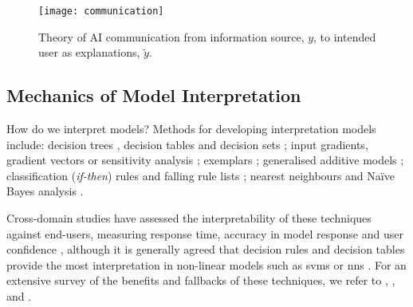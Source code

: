 \begin{figure}[t!]
  \centering
  \texttt{[image: communication]}
  \caption[Theory of AI communication]{Theory of AI communication from information source, $y$, to intended user as explanations, $\tilde{y}$.}
  \label{fig:background:probabilistic-stochastic:theory-of-ai-communication}
\end{figure}

\subsection{Mechanics of Model Interpretation}
\label{ssec:background:probabilistic-stochastic:mechanics}

How do we interpret models? Methods for developing interpretation models include: decision trees \citep{Breiman:1984tu,Hastie:2001wp,Craven:1995wg,Quinlan:1993vi,Rokach:2008wc}, decision tables \citep{Lima:2009tm,Baesens:2003we} and decision sets \citep{Lakkaraju:2016ka,Narayanan:2018ud}; input gradients, gradient vectors or sensitivity analysis \citep{Selvaraju:2017bk,Ribeiro:2016gg,Lei:2016wi,Ross:2017vn,Baehrens:2010tj}; exemplars \citep{Kim:2014ui,Frey:2007hs}; generalised additive models \citep{Caruana:2015jk}; classification (\textit{if-then}) rules \citep{Thrun:1996wh,Bramer:2007vg,Clark:1991vi,Otero:2013ul,Witten:2016ut} and falling rule lists \citep{Singh:2016wu}; nearest neighbours \citep{Martens:2011uh,Sen:1995uk,Suri:2007wl,Wettschereck:1997vw,Zhang:2008vfa} and Na\"{i}ve Bayes analysis \citep{Bellazzi:2008tv,Lavrac:1999tf,Kononenko:1993td,Zupan:2000tp,Michie:1994wi,Friedman:1997vs,Cheng:2001vw,Heckerman:2000uw}. 

Cross-domain studies have assessed the interpretability of these techniques against end-users, measuring response time, accuracy in model response and user confidence \citep{Huysmans:2011gq,Hayete:2005tn,Allahyari:2011ud,Subramanian:1992ue,Schwabacher:2001wc,Freitas:2010vk,Martens:2011uh,Verbeke:2011vo}, although it is generally agreed that decision rules and decision tables provide the most interpretation in non-linear models such as \glspl{svm} or \glspl{nn} \citep{Freitas:2010vk,Martens:2011uh,Verbeke:2011vo}. For an extensive survey of the benefits and fallbacks of these techniques, we refer to \citet{Freitas:2014ic}, \citet{DoshiVelez:2017vm}, and \citet{DoshiVelez:2017wu}.

